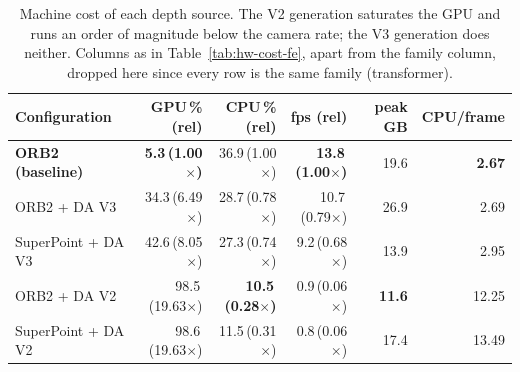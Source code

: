 \begin{table}[H]
\centering
\caption{Machine cost of each depth source. The V2 generation saturates the GPU and runs an order of magnitude below the camera rate; the V3 generation does neither. Columns as in Table~\ref{tab:hw-cost-fe}, apart from the family column, dropped here since every row is the same family (transformer).}
\label{tab:hw-cost-depth}
\footnotesize
\setlength{\tabcolsep}{4pt}
\begin{tabular}{@{}lrrrrr@{}}
\toprule
\textbf{Configuration} & \textbf{GPU\,\% (rel)} & \textbf{CPU\,\% (rel)} & \textbf{fps (rel)} & \textbf{peak GB} & \textbf{CPU/frame} \\
\midrule
\textbf{ORB2 (baseline)} & \textbf{5.3\,(1.00$\times$)} & 36.9\,(1.00$\times$) & \textbf{13.8\,(1.00$\times$)} & 19.6 & \textbf{2.67} \\
ORB2 + DA V3 & 34.3\,(6.49$\times$) & 28.7\,(0.78$\times$) & 10.7\,(0.79$\times$) & 26.9 & 2.69 \\
SuperPoint + DA V3 & 42.6\,(8.05$\times$) & 27.3\,(0.74$\times$) & 9.2\,(0.68$\times$) & 13.9 & 2.95 \\
ORB2 + DA V2 & 98.5\,(19.63$\times$) & \textbf{10.5\,(0.28$\times$)} & 0.9\,(0.06$\times$) & \textbf{11.6} & 12.25 \\
SuperPoint + DA V2 & 98.6\,(19.63$\times$) & 11.5\,(0.31$\times$) & 0.8\,(0.06$\times$) & 17.4 & 13.49 \\
\bottomrule
\end{tabular}
\end{table}
